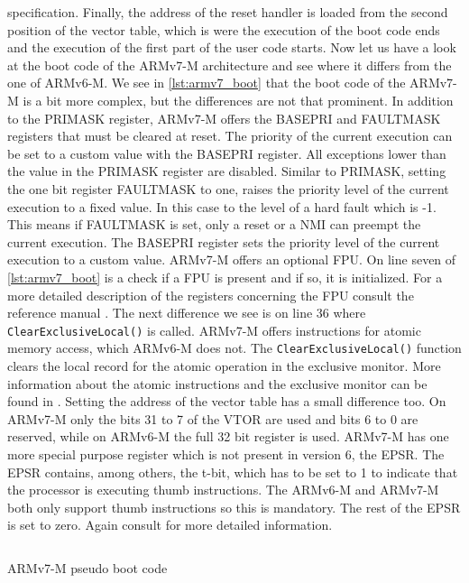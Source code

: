 \documentclass[a4paper,12pt]{article}
\newcommand{\inlinec}[1]{\texttt{#1}}
\newenvironment{code}{\captionsetup{type=listing}}{}
\begin{document}
specification. Finally, the address of the reset handler is loaded from the second position of the vector table, which is were the execution of the boot code ends and the execution of the first part of the user code starts.
\newpage Now let us have a look at the boot code of the ARMv7-M architecture and see where it differs from the one of ARMv6-M. We see in \autoref{lst:armv7_boot} that the boot code of the ARMv7-M is a bit more complex, but the differences are not that prominent. In addition to the \ac{PRIMASK} register, ARMv7-M offers the BASEPRI and FAULTMASK registers that must be cleared at reset. The priority of the current execution can be set to a custom value with the BASEPRI register. All exceptions lower than the value in the PRIMASK register are disabled. Similar to PRIMASK, setting the one bit register FAULTMASK to one, raises the priority level of the current execution to a fixed value. In this case to the level of a hard fault which is -1. This means if FAULTMASK is set, only a reset or a \ac{NMI} can preempt the current execution. The BASEPRI register sets the priority level of the current execution to a custom value. ARMv7-M offers an optional \ac{FPU}. On line seven of \autoref{lst:armv7_boot} is a check if a \ac{FPU} is present and if so, it is initialized. For a more detailed description of the registers concerning the \ac{FPU} consult the reference manual \cite{ARMv7-MRefManual}. The next difference we see is on line 36 where \inlinec{ClearExclusiveLocal()} is called. ARMv7-M offers instructions for atomic memory access, which ARMv6-M does not. The \inlinec{ClearExclusiveLocal()} function clears the local record for the atomic operation in the exclusive monitor. More information about the atomic instructions and the exclusive monitor can be found in \cite{ARMv7-MRefManual}. Setting the address of the vector table has a small difference too. On ARMv7-M only the bits 31 to 7 of the \ac{VTOR} are used and bits 6 to 0 are reserved, while on ARMv6-M the full 32 bit register is used. ARMv7-M has one more special purpose register which is not present in version 6, the \ac{EPSR}. The \ac{EPSR} contains, among others, the t-bit, which has to be set to 1 to indicate that the processor is executing thumb instructions. The ARMv6-M and ARMv7-M both only support thumb instructions so this is mandatory. The rest of the \ac{EPSR} is set to zero. Again consult \cite{ARMv7-MRefManual} for more detailed information.

\begin{code}
  \inputminted{c}{code/armv7_reset_pseudo.txt}
  \caption{ARMv7-M pseudo boot code \cite{ARMv7-MRefManual}}
  \vspace{1.5em}
  \label{lst:armv7_boot}
\end{code}
\end{document}
